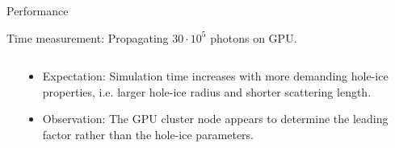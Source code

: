 
\begin{frame}[fragile]{Performance}

  Time measurement: Propagating $30 \cdot 10^5$ photons on GPU.

  \begin{columns}
    \begin{column}{0.6\textwidth}
    \end{column}
    \begin{column}{0.4\textwidth}
      \begin{itemize}
        \item Expectation: Simulation time increases with more demanding hole-ice properties, i.e. larger hole-ice radius and shorter scattering length.
        \item Observation: The GPU cluster node appears to determine the leading factor rather than the hole-ice parameters.
      \end{itemize}
    \end{column}
  \end{columns}


\end{frame}